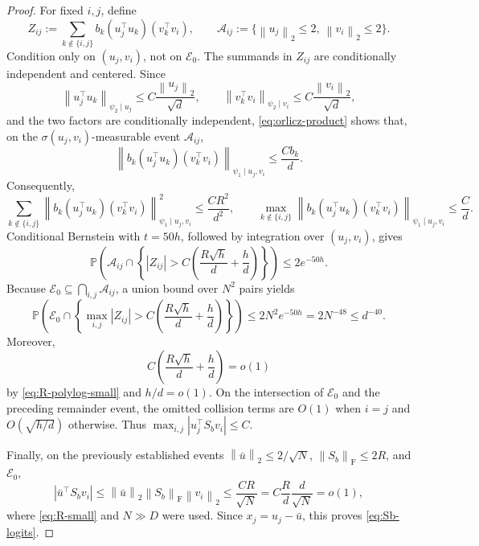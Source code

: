 \documentclass[11pt]{article}
\theoremstyle{remark}
\newcommand{\Pp}{\mathbb P}
\newcommand{\norm}[1]{\left\lVert #1\right\rVert}
\newcommand{\F}{\mathrm{F}}
\newcommand{\1}{\mathbf 1}
\newcommand{\psiOne}{\psi_1}
\newcommand{\psiTwo}{\psi_2}
\begin{document}
\begin{proof}
For fixed $i,j$, define
\[
 Z_{ij}:=
 \sum_{k\notin\{i,j\}}b_k(u_j^\top u_k)(v_k^\top v_i),
 \qquad
 \mathcal A_{ij}:=
 \{\norm{u_j}_2\leq2,\ \norm{v_i}_2\leq2\}.
\]
Condition only on $(u_j,v_i)$, not on $\mathcal E_0$.  The summands in
$Z_{ij}$ are conditionally independent and centered.  Since
\[
 \norm{u_j^\top u_k}_{\psiTwo\mid u_j}
 \leq C\frac{\norm{u_j}_2}{\sqrt d},
 \qquad
 \norm{v_k^\top v_i}_{\psiTwo\mid v_i}
 \leq C\frac{\norm{v_i}_2}{\sqrt d},
\]
and the two factors are conditionally independent,
\eqref{eq:orlicz-product} shows that, on the
$\sigma(u_j,v_i)$-measurable event $\mathcal A_{ij}$,
\[
 \norm{b_k(u_j^\top u_k)(v_k^\top v_i)}
       _{\psiOne\mid u_j,v_i}
 \leq\frac{Cb_k}{d}.
\]
Consequently,
\[
 \sum_{k\notin\{i,j\}}
 \norm{b_k(u_j^\top u_k)(v_k^\top v_i)}
       _{\psiOne\mid u_j,v_i}^2
 \leq\frac{CR^2}{d^2},
 \qquad
 \max_{k\notin\{i,j\}}
 \norm{b_k(u_j^\top u_k)(v_k^\top v_i)}
       _{\psiOne\mid u_j,v_i}
 \leq\frac Cd.
\]
Conditional Bernstein with $t=50h$, followed by integration over
$(u_j,v_i)$, gives
\[
 \Pp\!\left(
 \mathcal A_{ij}\cap
 \left\{|Z_{ij}|>
 C\left(\frac{R\sqrt h}{d}+\frac hd\right)\right\}
 \right)
 \leq2e^{-50h}.
\]
Because $\mathcal E_0\subseteq\bigcap_{i,j}\mathcal A_{ij}$, a union
bound over $N^2$ pairs yields
\[
 \Pp\!\left(
 \mathcal E_0\cap
 \left\{\max_{i,j}|Z_{ij}|>
 C\left(\frac{R\sqrt h}{d}+\frac hd\right)\right\}
 \right)
 \leq2N^2e^{-50h}
 =2N^{-48}\leq d^{-40}.
\]
Moreover,
\begin{equation}
 C\left(\frac{R\sqrt h}{d}+\frac hd\right)=o(1)
 \label{eq:Sb-remainder}
\end{equation}
by \eqref{eq:R-polylog-small} and $h/d=o(1)$.  On the intersection
of $\mathcal E_0$ and the preceding remainder event, the omitted
collision terms are $O(1)$ when $i=j$ and $O(\sqrt{h/d})$ otherwise.
Thus $\max_{i,j}|u_j^\top S_bv_i|\leq C$.

Finally, on the previously established events
$\norm{\bar u}_2\leq2/\sqrt N$, $\norm{S_b}_{\F}\leq2R$, and
$\mathcal E_0$,
\[
 |\bar u^\top S_bv_i|
 \leq\norm{\bar u}_2\norm{S_b}_{\F}\norm{v_i}_2
 \leq\frac{CR}{\sqrt N}
 =C\frac Rd\frac d{\sqrt N}=o(1),
\]
where \eqref{eq:R-small} and $N\gg D$ were used.  Since
$x_j=u_j-\bar u$, this proves \eqref{eq:Sb-logits}.


\end{proof}
\end{document}
